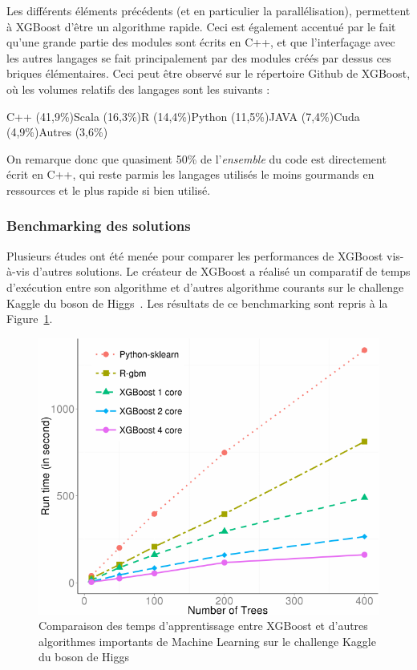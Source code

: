 Les différents éléments précédents (et en particulier la parallélisation), permettent à XGBoost d'être un algorithme rapide. Ceci est également accentué par le fait qu'une grande partie des modules sont écrits en C++, et que l'interfaçage avec les autres langages se fait principalement par des modules créés par dessus ces briques élémentaires. Ceci peut être observé sur le répertoire Github de XGBoost, où les volumes relatifs des langages sont les suivants :
\begin{center}
	C++ (41,9\%)\hspace{1cm}Scala (16,3\%)\hspace{1cm}R (14,4\%)\hspace{1cm}Python (11,5\%)\hspace{1cm}JAVA (7,4\%)\hspace{1cm}Cuda (4,9\%)\hspace{1cm}Autres (3,6\%)
\end{center}
On remarque donc que quasiment 50\% de l'\textit{ensemble} du code est directement écrit en C++, qui reste parmis les langages utilisés le moins gourmands en ressources et le plus rapide si bien utilisé.

\subsubsection{Benchmarking des solutions}
Plusieurs études ont été menée pour comparer les performances de XGBoost vis-à-vis d'autres solutions.
Le créateur de XGBoost a réalisé un comparatif de temps d'exécution entre son algorithme et d'autres algorithme courants sur le challenge Kaggle du boson de Higgs~\cite{bib:boson}. Les résultats de ce benchmarking sont repris à la Figure~\ref{fig:perfun}.

\begin{figure}[h]
	\begin{margincap}
		\centering
		\includegraphics[width=.6\textwidth]{images/More/perf_un}
		\caption{Comparaison des temps d'apprentissage entre XGBoost et d'autres algorithmes importants de Machine Learning sur le challenge Kaggle du boson de Higgs}
		\label{fig:perfun}
	\end{margincap}
\end{figure}

